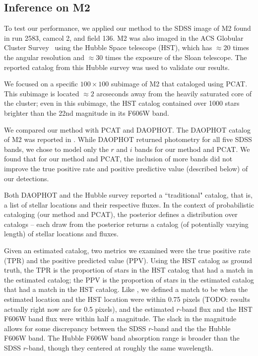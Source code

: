\subsection{Inference on M2}
To test our performance, we applied our method to the SDSS image of M2 found in run 2583, camcol 2, and field 136.
M2 was also imaged in the ACS Globular Cluster Survey~\cite{Sarajedini_2007}
using the Hubble Space telescope (HST),
which has $\approx20$ times the angular resolution and $\approx30$ times the exposure of the Sloan telescope. The reported catalog from this Hubble survey was used to 
validate our results.

We focused on a specific $100 \times 100$ subimage of M2 that \cite{Portillo_2017, Feder_2019} cataloged using PCAT.
This subimage is located $\approx2$ arcseconds away from the heavily saturated core of the cluster;
even in this subimage, the HST catalog contained over 1000 stars brighter than the 22nd magnitude in its F606W band.

We compared our method with PCAT and DAOPHOT. The DAOPHOT catalog of M2 was reported in 
\cite{An_2008_m2}. While DAOPHOT returned photometry for all five SDSS bands, 
we chose to model only the $r$ and $i$ bands for our method and PCAT. We found 
that for our method and PCAT, the inclusion of more bands did not improve
the true positive rate and positive predictive value (described below) of our detections. 

Both DAOPHOT and the Hubble survey reported a ``traditional" catalog, that is, a list of stellar locations and their respective fluxes. In the context of probabilistic cataloging (our method and PCAT), the posterior 
defines a distribution over catalogs -- each draw from the posterior returns a catalog 
(of potentially varying length) of stellar locations and fluxes. 

Given an estimated catalog, two metrics we examined were the true positive rate (TPR) and the positive predicted value (PPV). Using the HST catalog as ground truth, the TPR is the proportion of stars in the HST catalog that had a match in the estimated catalog;
the PPV is the proportion of stars in the estimated catalog that had a match in the HST catalog. Like \cite{Portillo_2017, Feder_2019}, we defined a match to be when the estimated location and the HST location were within 0.75 pixels
(TODO: results actually right now are for 0.5 pixels),
and the estimated $r$-band flux and the HST F606W band flux were within half a
magnitude. The slack in the magnitude allows for some discrepancy between the 
SDSS $r$-band and the the Hubble F606W band. The Hubble F606W band absorption range is broader than the SDSS $r$-band, though they centered at roughly the same wavelength. 

